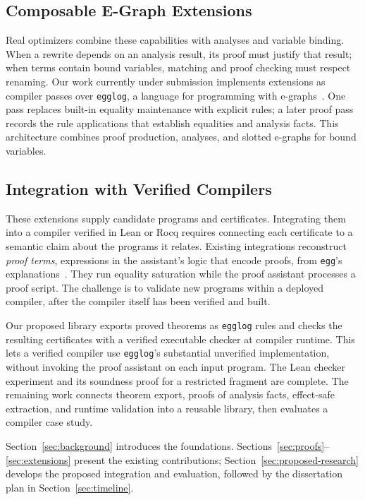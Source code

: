 \subsection{Composable E-Graph Extensions}
\label{sec:intro-extensions}

Real optimizers combine these capabilities with analyses and variable binding.
When a rewrite depends on an analysis result, its proof must justify that result;
  when terms contain bound variables, matching and proof checking must respect renaming.
Our work currently under submission implements extensions as compiler passes
  over \texttt{egglog}, a language for programming with e-graphs~\cite{egglog,extended-egglog}.
One pass replaces built-in equality maintenance with explicit rules;
  a later proof pass records the rule applications that establish equalities and analysis facts.
This architecture combines proof production, analyses, and slotted e-graphs for bound variables.

\subsection{Integration with Verified Compilers}
\label{sec:intro-verified-compilation}

These extensions supply candidate programs and certificates.
Integrating them into a compiler verified in Lean or Rocq requires connecting
  each certificate to a semantic claim about the programs it relates.
Existing integrations reconstruct \emph{proof terms}, expressions in the assistant's logic
  that encode proofs, from \texttt{egg}'s explanations~\cite{lean-egg,coquetier}.
They run equality saturation while the proof assistant processes a proof script.
The challenge is to validate new programs within a deployed compiler,
  after the compiler itself has been verified and built.

Our proposed library exports proved theorems as \texttt{egglog} rules
  and checks the resulting certificates with a verified executable checker at compiler runtime.
This lets a verified compiler use \texttt{egglog}'s substantial unverified implementation,
  without invoking the proof assistant on each input program.
The Lean checker experiment and its soundness proof for a restricted fragment are complete.
The remaining work connects theorem export, proofs of analysis facts,
  effect-safe extraction, and runtime validation into a reusable library,
  then evaluates a compiler case study.

Section~\ref{sec:background} introduces the foundations.
Sections~\ref{sec:proofs}--\ref{sec:extensions} present the existing contributions;
  Section~\ref{sec:proposed-research} develops the proposed integration and evaluation,
  followed by the dissertation plan in Section~\ref{sec:timeline}.
